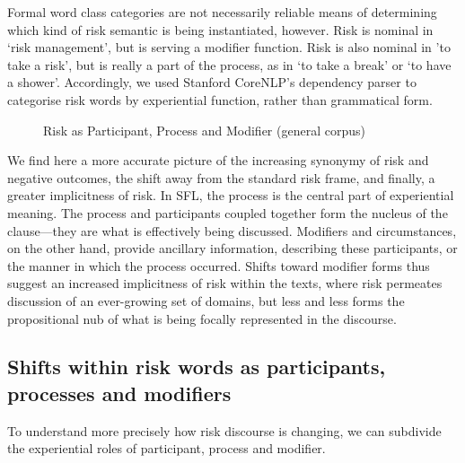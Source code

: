 Formal word class categories are not necessarily reliable means of determining which kind of risk semantic is being instantiated, however. Risk is nominal in `risk management', but is serving a modifier function. Risk is also nominal in 'to take a risk', but is really a part of the process, as in `to take a break' or `to have a shower'. Accordingly, we used Stanford CoreNLP's dependency parser to categorise risk words by experiential function, rather than grammatical form.

\begin{figure}[htb!]
\centering
{}
\caption{Risk as Participant, Process and Modifier (general corpus)}
\end{figure}

We find here a more accurate picture of the increasing synonymy of risk and negative outcomes, the shift away from the standard risk frame, and finally, a greater implicitness of risk. In SFL, the process is the central part of experiential meaning. The process and participants coupled together form the nucleus of the clause---they are what is effectively being discussed. Modifiers and circumstances, on the other hand, provide ancillary information, describing these participants, or the manner in which the process occurred. Shifts toward modifier forms thus suggest an increased implicitness of risk within the texts, where risk permeates discussion of an ever-growing set of domains, but less and less forms the propositional nub of what is being focally represented in the discourse.

\subsection{Shifts within risk words as participants, processes and modifiers}

To understand more precisely how risk discourse is changing, we can subdivide the experiential roles of participant, process and modifier.

